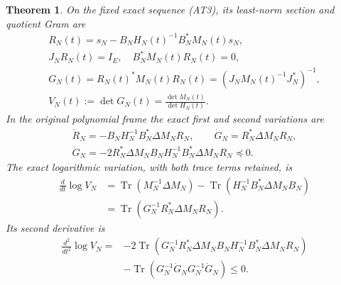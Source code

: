 \documentclass[11pt]{article}
\newcommand{\Tr}{\operatorname{Tr}}
\newtheorem{theorem}{Theorem}
\begin{document}
\begin{theorem}
On the fixed exact sequence (AT3), its least-norm section and quotient
Gram are
\[
 \begin{gathered}
 R_N(t)=s_N-B_NH_N(t)^{-1}B_N^*M_N(t)s_N,\\
 J_NR_N(t)=I_E,\quad B_N^*M_N(t)R_N(t)=0,\\
 G_N(t)=R_N(t)^*M_N(t)R_N(t)
       =(J_NM_N(t)^{-1}J_N^*)^{-1},\\
 V_N(t):=\det G_N(t)=\frac{\det M_N(t)}{\det H_N(t)}.
                                                        \tag{AT6}
 \end{gathered}
\]
In the original polynomial frame the exact first and second variations
are
\[
 \begin{gathered}
 \dot R_N=-B_NH_N^{-1}B_N^*\Delta M_NR_N,\qquad
 \dot G_N=R_N^*\Delta M_NR_N,\\
 \ddot G_N=-2R_N^*\Delta M_NB_NH_N^{-1}B_N^*\Delta M_NR_N
            \preceq0.                                \tag{AT7}
 \end{gathered}
\]
The exact logarithmic variation, with both trace terms retained, is
\[
 \begin{split}
 \frac{d}{dt}\log V_N
 &=\Tr(M_N^{-1}\Delta M_N)
   -\Tr(H_N^{-1}B_N^*\Delta M_NB_N)\\
 &=\Tr(G_N^{-1}R_N^*\Delta M_NR_N).             \tag{AT8}
 \end{split}
\]
Its second derivative is
\[
 \begin{split}
 \frac{d^2}{dt^2}\log V_N
 ={}&-2\Tr(G_N^{-1}R_N^*\Delta M_NB_NH_N^{-1}
                         B_N^*\Delta M_NR_N)\\
    &-\Tr(G_N^{-1}\dot G_NG_N^{-1}\dot G_N)\le0.
                                                        \tag{AT9}
 \end{split}
\]
\end{theorem}
\end{document}
